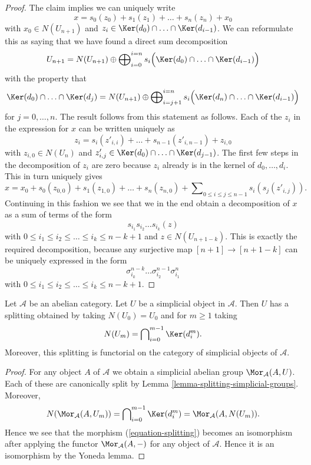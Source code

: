 \begin{proof}
\medskip\noindent
The claim implies we can uniquely write
$$
x = s_0(z_0) + s_1(z_1) + \ldots + s_n(z_n) + x_0
$$
with $x_0 \in N(U_{n + 1})$ and
$z_i \in \Ker(d_0) \cap \ldots \cap \Ker(d_{i - 1})$.
We can reformulate this as saying that we have found a direct
sum decomposition
$$
U_{n + 1}
=
N(U_{n + 1})
\oplus
\bigoplus\nolimits_{i = 0}^{i = n}
s_i\Big(\Ker(d_0) \cap \ldots \cap \Ker(d_{i - 1})\Big)
$$
with the property that
$$
\Ker(d_0) \cap \ldots \cap \Ker(d_j)
=
N(U_{n + 1}) \oplus
\bigoplus\nolimits_{i = j + 1}^{i = n}
s_i\Big(\Ker(d_n) \cap \ldots \cap \Ker(d_{i - 1})\Big)
$$
for $j = 0, \ldots, n$.
The result follows from this statement as follows.
Each of the $z_i$ in the expression for $x$
can be written uniquely as
$$
z_i = s_i(z'_{i, i}) + \ldots + s_{n - 1}(z'_{i, n - 1}) + z_{i, 0}
$$
with $z_{i, 0} \in N(U_n)$ and
$z'_{i, j} \in \Ker(d_0) \cap \ldots \cap \Ker(d_{j - 1})$.
The first few steps in the decomposition of $z_i$ are zero because
$z_i$ already is in the kernel of $d_0, \ldots, d_i$.
This in turn uniquely gives
$$
x = x_0 + s_0(z_{0, 0}) + s_1(z_{1, 0}) + \ldots + s_n(z_{n, 0}) +
\sum\nolimits_{0 \leq i \leq j \leq n - 1} s_i(s_j(z'_{i, j})).
$$
Continuing in this fashion we see that we in the end obtain
a decomposition of $x$ as a sum of terms
of the form
$$
s_{i_1} s_{i_2} \ldots s_{i_k} (z)
$$
with $0 \leq i_1 \leq i_2 \leq \ldots \leq i_k \leq n - k + 1$ and
$z \in N(U_{n + 1 - k})$. This is exactly the required
decomposition, because any surjective map $[n + 1] \to [n + 1 - k]$
can be uniquely expressed in the form
$$
\sigma^{n - k}_{i_k} \ldots \sigma^{n - 1}_{i_2} \sigma^n_{i_1}
$$
with $0 \leq i_1 \leq i_2 \leq \ldots \leq i_k \leq n - k + 1$.
\end{proof}

\begin{lemma}
\label{lemma-splitting-abelian-category}
Let $\mathcal{A}$ be an abelian category.
Let $U$ be a simplicial object in $\mathcal{A}$.
Then $U$ has a splitting obtained by taking $N(U_0) = U_0$ and
for $m \geq 1$ taking
$$
N(U_m) = \bigcap\nolimits_{i = 0}^{m - 1} \Ker(d^m_i).
$$
Moreover, this splitting is functorial on the category of
simplicial objects of $\mathcal{A}$.
\end{lemma}

\begin{proof}
For any object $A$ of $\mathcal{A}$ we obtain
a simplicial abelian group $\Mor_\mathcal{A}(A, U)$.
Each of these are canonically split by Lemma
\ref{lemma-splitting-simplicial-groups}. Moreover,
$$
N(\Mor_\mathcal{A}(A, U_m)) =
\bigcap\nolimits_{i = 0}^{m - 1} \Ker(d^m_i) =
\Mor_\mathcal{A}(A, N(U_m)).
$$
Hence we see that the morphism (\ref{equation-splitting})
becomes an isomorphism after applying the functor
$\Mor_\mathcal{A}(A, -)$ for any object of $\mathcal{A}$.
Hence it is an isomorphism by the Yoneda lemma.
\end{proof}

